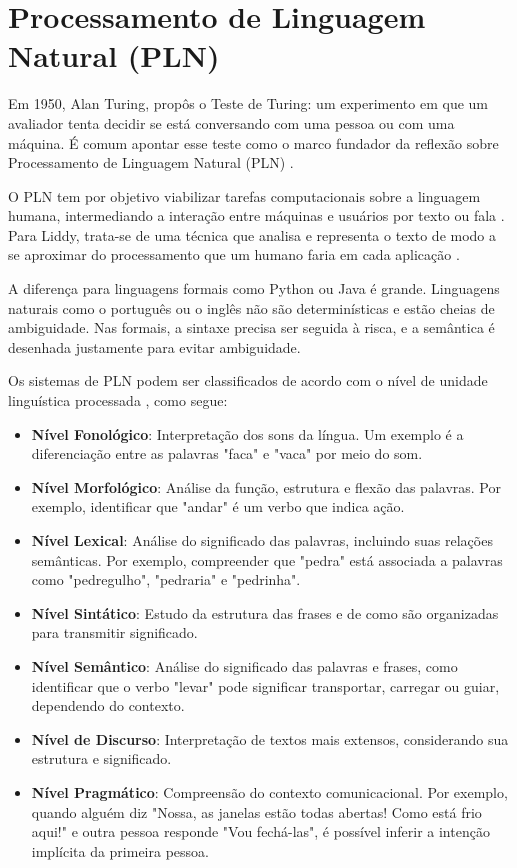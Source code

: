 \section{Processamento de Linguagem Natural (PLN)}

Em 1950, Alan Turing, propôs o Teste de Turing: um experimento em que um avaliador tenta decidir se está conversando com uma pessoa ou com uma máquina. É comum apontar esse teste como o marco fundador da reflexão sobre Processamento de Linguagem Natural (PLN) \cite{russel2010}.

O PLN tem por objetivo viabilizar tarefas computacionais sobre a linguagem humana, intermediando a interação entre máquinas e usuários por texto ou fala \cite{jurafsky2009}. Para Liddy, trata-se de uma técnica que analisa e representa o texto de modo a se aproximar do processamento que um humano faria em cada aplicação \cite{liddy1998}.

A diferença para linguagens formais como Python ou Java é grande. Linguagens naturais como o português ou o inglês não são determinísticas e estão cheias de ambiguidade. Nas formais, a sintaxe precisa ser seguida à risca, e a semântica é desenhada justamente para evitar ambiguidade.

Os sistemas de PLN podem ser classificados de acordo com o nível de unidade linguística processada \cite{liddy1998}, como segue:

\begin{itemize}
    \item \textbf{Nível Fonológico}: Interpretação dos sons da língua. Um exemplo é a diferenciação entre as palavras "faca" e "vaca" por meio do som.
    \item \textbf{Nível Morfológico}: Análise da função, estrutura e flexão das palavras. Por exemplo, identificar que "andar" é um verbo que indica ação.
    \item \textbf{Nível Lexical}: Análise do significado das palavras, incluindo suas relações semânticas. Por exemplo, compreender que "pedra" está associada a palavras como "pedregulho", "pedraria" e "pedrinha".
    \item \textbf{Nível Sintático}: Estudo da estrutura das frases e de como são organizadas para transmitir significado.
    \item \textbf{Nível Semântico}: Análise do significado das palavras e frases, como identificar que o verbo "levar" pode significar transportar, carregar ou guiar, dependendo do contexto.
    \item \textbf{Nível de Discurso}: Interpretação de textos mais extensos, considerando sua estrutura e significado.
    \item \textbf{Nível Pragmático}: Compreensão do contexto comunicacional. Por exemplo, quando alguém diz "Nossa, as janelas estão todas abertas! Como está frio aqui!" e outra pessoa responde "Vou fechá-las", é possível inferir a intenção implícita da primeira pessoa.
\end{itemize}

